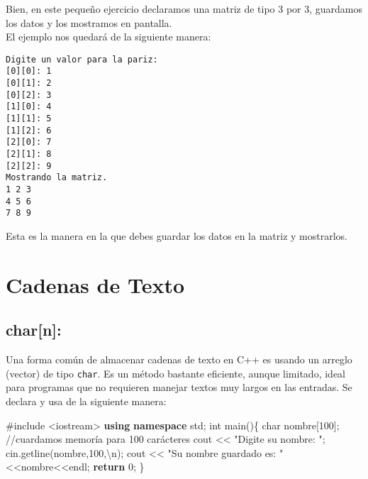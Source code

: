 \documentclass[
  11pt,
  a4paper,
  DIV=11,
  numbers=noendperiod]{scrreprt}
\newenvironment{Shaded}{\begin{snugshade}}{\end{snugshade}}
\newcommand{\CharTok}[1]{\textcolor[rgb]{0.13,0.47,0.30}{#1}}
\newcommand{\CommentTok}[1]{\textcolor[rgb]{0.37,0.37,0.37}{#1}}
\newcommand{\ControlFlowTok}[1]{\textcolor[rgb]{0.00,0.23,0.31}{\textbf{#1}}}
\newcommand{\DataTypeTok}[1]{\textcolor[rgb]{0.68,0.00,0.00}{#1}}
\newcommand{\DecValTok}[1]{\textcolor[rgb]{0.68,0.00,0.00}{#1}}
\newcommand{\ImportTok}[1]{\textcolor[rgb]{0.00,0.46,0.62}{#1}}
\newcommand{\KeywordTok}[1]{\textcolor[rgb]{0.00,0.23,0.31}{\textbf{#1}}}
\newcommand{\NormalTok}[1]{\textcolor[rgb]{0.00,0.23,0.31}{#1}}
\newcommand{\OperatorTok}[1]{\textcolor[rgb]{0.37,0.37,0.37}{#1}}
\newcommand{\PreprocessorTok}[1]{\textcolor[rgb]{0.68,0.00,0.00}{#1}}
\newcommand{\SpecialCharTok}[1]{\textcolor[rgb]{0.37,0.37,0.37}{#1}}
\newcommand{\StringTok}[1]{\textcolor[rgb]{0.13,0.47,0.30}{#1}}
\begin{document}
Bien, en este pequeño ejercicio declaramos una matriz de tipo 3 por 3,
guardamos los datos y los mostramos en pantalla.\\
El ejemplo nos quedará de la siguiente manera:

\begin{tcolorbox}[custombox]
\begin{verbatim}
Digite un valor para la pariz:
[0][0]: 1
[0][1]: 2
[0][2]: 3
[1][0]: 4
[1][1]: 5
[1][2]: 6
[2][0]: 7
[2][1]: 8
[2][2]: 9
Mostrando la matriz.
1 2 3
4 5 6
7 8 9
\end{verbatim}
\end{tcolorbox}

Esta es la manera en la que debes guardar los datos en la matriz y
mostrarlos.


\chapter{Cadenas de Texto}\label{cadenas-de-texto}

\section{char{[}n{]}:}\label{charn}

Una forma común de almacenar cadenas de texto en C++ es usando un
arreglo (vector) de tipo \texttt{char}. Es un método bastante eficiente,
aunque limitado, ideal para programas que no requieren manejar textos
muy largos en las entradas. Se declara y usa de la siguiente manera:

\begin{Shaded}
\begin{Highlighting}[]
\PreprocessorTok{\#include }\ImportTok{\textless{}iostream\textgreater{}}
\KeywordTok{using} \KeywordTok{namespace}\NormalTok{ std}\OperatorTok{;}
\DataTypeTok{int}\NormalTok{ main}\OperatorTok{()\{}
    \DataTypeTok{char}\NormalTok{ nombre}\OperatorTok{[}\DecValTok{100}\OperatorTok{];} \CommentTok{//cuardamos memoría para 100 carácteres}
\NormalTok{    cout }\OperatorTok{\textless{}\textless{}} \StringTok{"Digite su nombre: "}\OperatorTok{;}
\NormalTok{    cin}\OperatorTok{.}\NormalTok{getline}\OperatorTok{(}\NormalTok{nombre}\OperatorTok{,}\DecValTok{100}\OperatorTok{,}\CharTok{\textquotesingle{}}\SpecialCharTok{\textbackslash{}n}\CharTok{\textquotesingle{}}\OperatorTok{);}
\NormalTok{    cout }\OperatorTok{\textless{}\textless{}} \StringTok{"Su nombre guardado es: "}\OperatorTok{\textless{}\textless{}}\NormalTok{nombre}\OperatorTok{\textless{}\textless{}}\NormalTok{endl}\OperatorTok{;}
    \ControlFlowTok{return} \DecValTok{0}\OperatorTok{;}
\OperatorTok{\}}
\end{Highlighting}
\end{Shaded}
\end{document}
